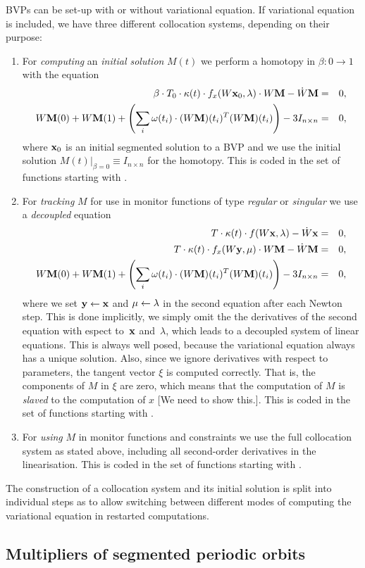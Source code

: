 BVPs can be set-up with or without variational equation. If variational equation is included, we have three different collocation systems, depending on their purpose:
%
\begin{enumerate}
\item For \emph{computing} an \emph{initial solution} $M(t)$ we perform a homotopy in $\beta : 0\to 1$ with the equation
%
\begin{eqnarray*}
\beta \cdot T_0 \cdot \kappa(t) \cdot f_x(W\mathbf{x}_0,\lambda)\cdot W\mathbf{M} - \dot{W}\mathbf{M} & = & 0, \\
W\mathbf{M}(0) + W\mathbf{M}(1) + \left(\sum_{i} \omega(t_i) \cdot
	(W\mathbf{M})(t_i)^T (W\mathbf{M})(t_i)\right) - 3 I_{n\times n}
	& = & 0,
\end{eqnarray*}
%
where $\mathbf{x}_0$ is an initial segmented solution to a BVP and we use the initial solution $M(t)|_{\beta=0} \equiv I_{n\times n}$ for the homotopy. This is coded in the set of functions starting with .

\item For \emph{tracking} $M$ for use in monitor functions of type \emph{regular} or \emph{singular} we use a \emph{decoupled} equation
%
\begin{eqnarray*}
T \cdot \kappa(t) \cdot f(W\mathbf{x},\lambda) - \dot{W}\mathbf{x} & = & 0, \\
T \cdot \kappa(t) \cdot f_x(W\mathbf{y},\mu)\cdot W\mathbf{M} - \dot{W}\mathbf{M} & = & 0, \\
W\mathbf{M}(0) + W\mathbf{M}(1) + \left(\sum_{i} \omega(t_i) \cdot
	(W\mathbf{M})(t_i)^T (W\mathbf{M})(t_i)\right) - 3 I_{n\times n}
	& = & 0,
\end{eqnarray*}
%
where we set $\mathbf{y}\leftarrow \mathbf{x}$ and $\mu\leftarrow \lambda$ in the second equation after each Newton step. This is done implicitly, we simply omit the the derivatives of the second equation with espect to~$\mathbf{x}$ and~$\lambda$, which leads to a decoupled system of linear equations. This is always well posed, because the variational equation always has a unique solution. Also, since we ignore derivatives with respect to parameters, the tangent vector $\xi$ is computed correctly. That is, the components of $M$ in $\xi$ are zero, which means that the computation of $M$ is \emph{slaved} to the computation of $x$ [We need to show this.]. This is coded in the set of functions starting with .

\item For \emph{using} $M$ in monitor functions and constraints we use the full collocation system as stated above, including all second-order derivatives in the linearisation. This is coded in the set of functions starting with .
\end{enumerate}

The construction of a collocation system and its initial solution is split into individual steps as to allow switching between different modes of computing the variational equation in restarted computations.

\subsection{Multipliers of segmented periodic orbits}

